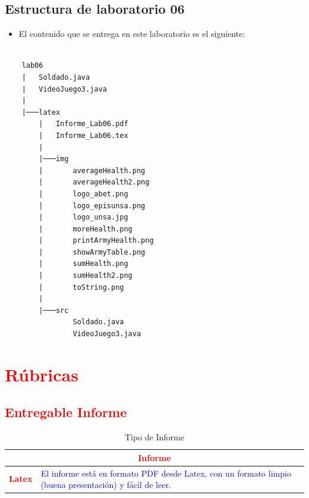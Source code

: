 \documentclass{article}
\begin{document}
	\subsection{Estructura de laboratorio 06}
    \begin{itemize}	
		\item El contenido que se entrega en este laboratorio es el siguiente:
	\end{itemize}
	
\begin{lstlisting}[style=ascii-tree]

    lab06
    |   Soldado.java
    |   VideoJuego3.java
    |
    |───latex
        |   Informe_Lab06.pdf
        |   Informe_Lab06.tex
        |
        |───img
        |       averageHealth.png
        |       averageHealth2.png
        |       logo_abet.png
        |       logo_episunsa.png
        |       logo_unsa.jpg
        |       moreHealth.png
        |       printArmyHealth.png
        |       showArmyTable.png
        |       sumHealth.png
        |       sumHealth2.png
        |       toString.png
        |
        |───src
                Soldado.java
                VideoJuego3.java

\end{lstlisting}    

	\section{\textcolor{red}{Rúbricas}}
	
	\subsection{\textcolor{red}{Entregable Informe}}
	\begin{table}[H]
		\caption{Tipo de Informe}
		\setlength{\tabcolsep}{0.5em} %
		{\renewcommand{\arraystretch}{1.5} %
		\begin{tabular}{|p{3cm}|p{12cm}|}
			\hline
			\multicolumn{2}{|c|}{\textbf{\textcolor{red}{Informe}}}  \\
			\hline 
			\textbf{\textcolor{red}{Latex}} & \textcolor{blue}{El informe está en formato PDF desde Latex,  con un formato limpio (buena presentación) y fácil de leer.}   \\ 
			\hline 
			
			
		\end{tabular}
	}
	\end{table}
	
\end{document}
